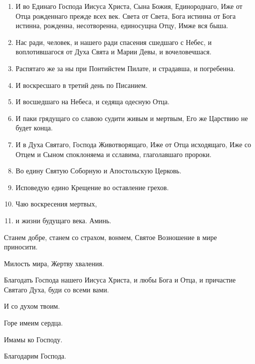 \begin{mymulticols}
\begin{enumerate}
\item И во Единаго Господа Иисуса Христа, Сына Божия, Единороднаго, Иже от Отца рожденнаго прежде всех век. Света от Света, Бога истинна от Бога истинна, рожденна, несотворенна, единосущна Отцу, Имже вся быша.

\item Нас ради, человек, и нашего ради спасения сшедшаго с Небес, и воплотившагося от Духа Свята и Марии Девы, и вочеловечшася.

\item Распятаго же за ны при Понтийстем Пилате, и страдавша, и погребенна.

\item И воскресшаго в третий день по Писанием.

\item И восшедшаго на Небеса, и седяща одесную Отца.

\item И паки грядущаго со славою судити живым и мертвым, Его же Царствию не будет конца.

\item И в Духа Святаго, Господа Животворящаго, Иже от Отца исходящаго, Иже со Отцем и Сыном споклоняема и сславима, глаголавшаго пророки.

\item Во едину Святую Соборную и Апостольскую Церковь.

\item Исповедую едино Крещение во оставление грехов.

\item Чаю воскресения мертвых,

\item и жизни будущаго века. Аминь. 

\end{enumerate}


 Станем добре, станем со страхом, вонмем, Святое Возношение в мире приносити.

 Милость мира, Жертву хваления. 

 Благодать Господа нашего Иисуса Христа, и любы Бога и Отца, и причастие Святаго Духа, буди со всеми вами.

 И со духом твоим. 

 Горе имеим сердца. 

 Имамы ко Господу. 

 Благодарим Господа. 


\end{mymulticols}
